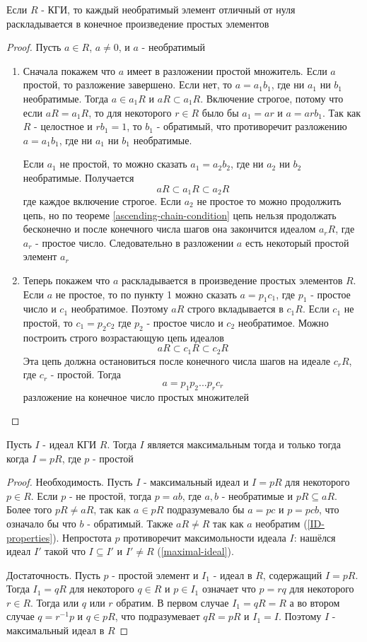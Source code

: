 \documentclass[../main/document.tex]{subfiles}
\begin{document}
\begin{thm}\label{proper-factorization}
Если $R$ - КГИ, то каждый необратимый элемент отличный от нуля раскладывается в конечное произведение простых элементов
\begin{proof}
Пусть $a\in R$, $a\neq 0$, и $a$ - необратимый
\begin{enumerate}
\item Сначала покажем что $a$ имеет в разложении простой множитель. Если $a$ простой, то разложение завершено. Если нет, то $a=a_1b_1$, где ни $a_1$ ни $b_1$ необратимые. Тогда $a\in a_1R$ и $aR \subset a_1R$. Включение строгое, потому что если $aR=a_1R$, то для некоторого $r\in R$ было бы $a_1=ar$ и $a=arb_1$. Так как $R$ - целостное и $rb_1=1$, то $b_1$ - обратимый, что противоречит разложению $a=a_1b_1$, где ни $a_1$ ни $b_1$ необратимые.

Если $a_1$ не простой, то можно сказать $a_1=a_2b_2$, где ни $a_2$ ни $b_2$ необратимые. Получается
$$aR \subset a_1R \subset a_2R$$
где каждое включение строгое. Если $a_2$ не простое то можно продолжить цепь, но по теореме \ref{ascending-chain-condition} цепь нельзя продолжать бесконечно  и после конечного числа шагов она закончится идеалом $a_rR$, где $a_r$ - простое число. Следовательно в разложении $a$ есть некоторый простой элемент $a_r$
\item Теперь покажем что $a$ раскладывается в произведение простых элементов $R$. Если $a$ не простое, то по пункту 1 можно сказать $a=p_1c_1$, где $p_1$ - простое число и $c_1$ необратимое. Поэтому $aR$ строго вкладывается в $c_1R$. Если $c_1$ не простой, то $c_1=p_2c_2$ где $p_2$ - простое число и $c_2$ необратимое. Можно построить строго возрастающую цепь идеалов
$$aR \subset c_1R \subset c_2R$$
Эта цепь должна остановиться после конечного числа шагов на идеале $c_rR$, где $c_r$ - простой. Тогда
$$a=p_1p_2...p_rc_r$$
разложение на конечное число простых множителей
\end{enumerate}
\end{proof}
\end{thm}
\begin{lemma}\label{prime-generates-maximal}
Пусть $I$ - идеал КГИ $R$. Тогда $I$ является максимальным тогда и только тогда когда $I=pR$, где $p$ - простой
\begin{proof}
Необходимость. Пусть $I$ - максимальный идеал и $I=pR$ для некоторого $p\in R$. Если $p$ - не простой, тогда $p=ab$, где $a,b$ - необратимые и  $pR\subseteq aR$. Более того $pR\neq aR$, так как $a\in pR$ подразумевало бы $a=pc$ и $p=pcb$, что означало бы что $b$ - обратимый. Также $aR\neq R$ так как $a$ необратим (\ref{ID-properties}). Непростота $p$ противоречит максимольности идеала $I$: нашёлся идеал $I'$ такой что $I\subseteq I'$ и $I'\neq R$ (\ref{maximal-ideal}).

Достаточность. Пусть $p$ - простой элемент и $I_1$ - идеал в $R$, содержащий $I=pR$. Тогда $I_1=qR$ для некоторого $q\in R$ и $p\in I_1$ означает что $p=rq$ для некоторого $r\in R$. Тогда или $q$ или $r$ обратим. В первом случае $I_1=qR=R$ а во втором случае $q=r^{-1}p$ и $q\in pR$, что подразумевает $qR=pR$ и $I_1=I$. Поэтому $I$ - максимальный идеал в $R$ 
\end{proof}
\end{lemma}
\end{document}
